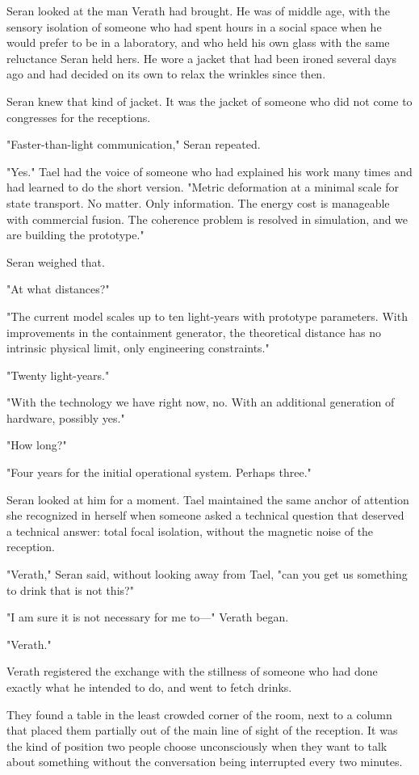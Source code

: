 \documentclass[11pt,a5paper,twoside]{book}
\begin{document}
Seran looked at the man Verath had brought. He was of middle age, with the sensory isolation of someone who had spent hours in a social space when he would prefer to be in a laboratory, and who held his own glass with the same reluctance Seran held hers. He wore a jacket that had been ironed several days ago and had decided on its own to relax the wrinkles since then.

Seran knew that kind of jacket. It was the jacket of someone who did not come to congresses for the receptions.

"Faster-than-light communication," Seran repeated.

"Yes." Tael had the voice of someone who had explained his work many times and had learned to do the short version. "Metric deformation at a minimal scale for state transport. No matter. Only information. The energy cost is manageable with commercial fusion. The coherence problem is resolved in simulation, and we are building the prototype."

Seran weighed that.

"At what distances?"

"The current model scales up to ten light-years with prototype parameters. With improvements in the containment generator, the theoretical distance has no intrinsic physical limit, only engineering constraints."

"Twenty light-years."

"With the technology we have right now, no. With an additional generation of hardware, possibly yes."

"How long?"

"Four years for the initial operational system. Perhaps three."

Seran looked at him for a moment. Tael maintained the same anchor of attention she recognized in herself when someone asked a technical question that deserved a technical answer: total focal isolation, without the magnetic noise of the reception.

"Verath," Seran said, without looking away from Tael, "can you get us something to drink that is not this?"

"I am sure it is not necessary for me to—" Verath began.

"Verath."

Verath registered the exchange with the stillness of someone who had done exactly what he intended to do, and went to fetch drinks.

They found a table in the least crowded corner of the room, next to a column that placed them partially out of the main line of sight of the reception. It was the kind of position two people choose unconsciously when they want to talk about something without the conversation being interrupted every two minutes.
\end{document}
